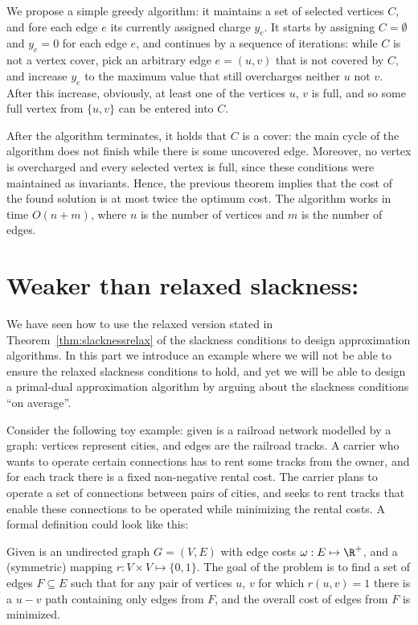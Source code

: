 \noindent
We propose a simple greedy algorithm: it maintains a set of selected vertices $C$, and fore each edge
$e$ its currently assigned charge $y_e$. It starts by assigning $C=\emptyset$ and $y_e=0$ for 
each edge $e$, and continues by a sequence of iterations: while $C$ is not a vertex cover, pick an 
arbitrary edge $e=(u,v)$ that is not covered by $C$, and increase $y_e$ to the maximum value that still
overcharges neither $u$ not $v$. After this increase, obviously, at least one of the 
vertices $u$, $v$ is full, and so some full vertex from $\{u,v\}$ can be entered into $C$. 

\noindent
After the algorithm terminates, it holds that $C$ is a cover: the main cycle of the algorithm does not 
finish while there is some uncovered edge. Moreover, no vertex is overcharged and every selected vertex is full,
since these conditions were maintained as invariants. Hence, the previous theorem implies that the cost of the
found solution
is at most twice the optimum cost. The algorithm works in time $O(n+m)$, where $n$ is the number of vertices
and $m$ is the number of edges.

\section{Weaker than relaxed slackness: \minsforest}

\noindent
We have seen how to use the relaxed version stated in Theorem~\ref{thm:slacknessrelax}
of the slackness conditions to design approximation algorithms.
In this part we introduce an example where we will not be able to ensure the relaxed slackness conditions
to hold, and yet we will be able to design a primal-dual approximation algorithm by arguing about the
slackness conditions ``on average''.

\noindent
Consider the following toy example: given is a railroad network modelled by a graph: vertices represent
cities, and edges are the railroad tracks. A carrier who wants to operate certain connections has to 
rent some tracks from the owner, and for each track there is a fixed non-negative rental cost. The carrier
plans to operate a set of connections between pairs of cities, and seeks to rent tracks that enable
these connections to be operated while minimizing the rental costs. A formal definition could look
like this:


\begin{framed}
  \begin{dfn}
    Given is an undirected graph  $G=(V,E)$ with edge costs $\omega:E\mapsto\R^+$, and a (symmetric)
    mapping $r:V\times V\mapsto\{0,1\}$. The goal of the \minsforest problem is to find a set of
    edges $F\subseteq E$ such that for any pair of vertices $u$, $v$ for which $r(u,v)=1$ there 
    is a $u-v$ path containing only edges from $F$, and the overall cost of edges from $F$ is minimized.
  \end{dfn}
\end{framed}


